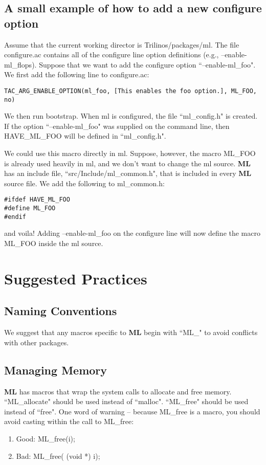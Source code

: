 \documentclass{article}[12pt]
\newcommand{\ML}     {{\bf ML }}
\newcommand{\be}     {\begin{enumerate}}
\newcommand{\ee}     {\end{enumerate}}
\begin{document}
\subsection{A small example of how to add a new configure option}

Assume that the current working director is Trilinos/packages/ml.
The file configure.ac contains all of the configure line option definitions
(e.g., --enable-ml\_flops).   Suppose that we want to add the configure option
``--enable-ml\_foo".
We first add the following line to configure.ac:\\
\begin{verbatim}
TAC_ARG_ENABLE_OPTION(ml_foo, [This enables the foo option.], ML_FOO, no)
\end{verbatim}

\noindent
We then run bootstrap.
When ml is configured, the file ``ml\_config.h" is created.
If the option ``--enable-ml\_foo" was supplied on the command line, then
HAVE\_ML\_FOO will be defined in ``ml\_config.h".

We could use this macro directly in ml.
Suppose, however, the macro ML\_FOO is already used
heavily in ml, and we don't want to change the ml source.
\ML has an include file, ``src/Include/ml\_common.h", that is included in
every \ML source file.
We add the following to ml\_common.h:\\

\noindent
\begin{verbatim}
#ifdef HAVE_ML_FOO
#define ML_FOO
#endif
\end{verbatim}

\noindent
and voila!   Adding --enable-ml\_foo on the configure line will now define the
macro ML\_FOO inside the ml source.

\section{Suggested Practices}

\subsection{Naming Conventions}
We suggest that any macros specific to \ML begin with ``ML\_" to avoid conflicts with other
packages.

\subsection{Managing Memory}
\ML has macros that wrap the system calls to allocate and free memory.
``ML\_allocate" should be used instead of ``malloc".
``ML\_free" should be used instead of ``free".
One word of warning -- because ML\_free is a macro, you should avoid casting
within the call to ML\_free:
\be
\item Good: ML\_free(i);
\item Bad: ML\_free( (void *) i);
\ee
\end{document}
